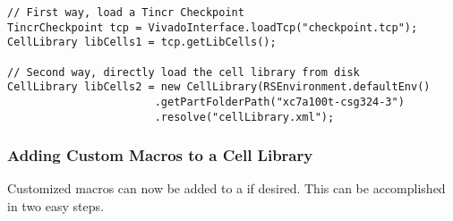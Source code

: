 \begin{lstlisting}[caption=How to load a CellLibrary,
label=code:cellLibrary] 
// First way, load a Tincr Checkpoint
TincrCheckpoint tcp = VivadoInterface.loadTcp("checkpoint.tcp");
CellLibrary libCells1 = tcp.getLibCells();

// Second way, directly load the cell library from disk
CellLibrary libCells2 = new CellLibrary(RSEnvironment.defaultEnv()
                       .getPartFolderPath("xc7a100t-csg324-3")
                       .resolve("cellLibrary.xml");

\end{lstlisting}

\subsubsection{Adding Custom Macros to a Cell Library} \label{sec:customMacros}
Customized macros can now be added to a  if desired. This can
be accomplished in two easy steps. 

